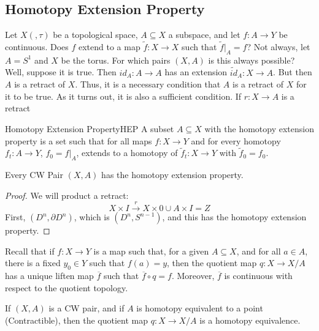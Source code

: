 \documentclass{book}                                                           %
\begin{document}
    \subsection{Homotopy Extension Property}
        Let $X(,\tau)$ be a topological space,
        $A\subseteq{X}$ a subspace, and let
        $f:A\rightarrow{Y}$ be continuous. Does
        $f$ extend to a map $\tilde{f}:X\rightarrow{X}$
        such that $\tilde{f}|_{A}=f$? Not always, let
        $A=S^{1}$ and $X$ be the torus. For which pairs
        $(X,A)$ is this always possible? Well, suppose
        it is true. Then $id_{A}:A\rightarrow{A}$ has
        an extension $\tilde{id}_{A}:X\rightarrow{A}$.
        But then $A$ is a retract of $X$. Thus, it
        is a necessary condition that $A$ is a retract
        of $X$ for it to be true. As it turns out, it is
        also a sufficient condition. If
        $r:X\rightarrow{A}$ is a retract
        \begin{ldefinition}{Homotopy Extension Property}{HEP}
            A subset $A\subseteq{X}$ with the homotopy
            extension property is a set such that for all
            maps $f:X\rightarrow{Y}$ and for every
            homotopy $f_{t}:A\rightarrow{Y}$,
            $f_{0}=f|_{A}$, extends to a homotopy of
            $\tilde{f}_{t}:X\rightarrow{Y}$ with
            $\tilde{f}_{0}=f_{0}$.
        \end{ldefinition}
        \begin{theorem}
            Every CW Pair $(X,A)$ has the homotopy
            extension property.
        \end{theorem}
        \begin{proof}
            We will product a retract:
            \begin{equation}
                X\times{I}\overset{r}{\longrightarrow}
                    X\times{0}\cup{A}\times{I}=Z
            \end{equation}
            First, $(D^{n},\partial{D}^{n})$, which is
            $(D^{n},S^{n-1})$, and this has the
            homotopy extension property.
        \end{proof}
        Recall that if $f:X\rightarrow{Y}$ is a map such that,
        for a given $A\subseteq{X}$, and for all $a\in{A}$,
        there is a fixed $y_{0}\in{Y}$ such that $f(a)=y$, then
        the quotient map $q:X\rightarrow{X/A}$ has a unique
        liften map $\overline{f}$ such that
        $\overline{f}\circ{q}=f$. Moreover, $\overline{f}$ is
        continuous with respect to the quotient topology.
        \begin{theorem}
            If $(X,A)$ is a CW pair, and if $A$ is
            homotopy equivalent to a point
            (Contractible), then the quotient map
            $q:X\rightarrow{X/A}$ is a homotopy
            equivalence.
        \end{theorem}
\end{document}
